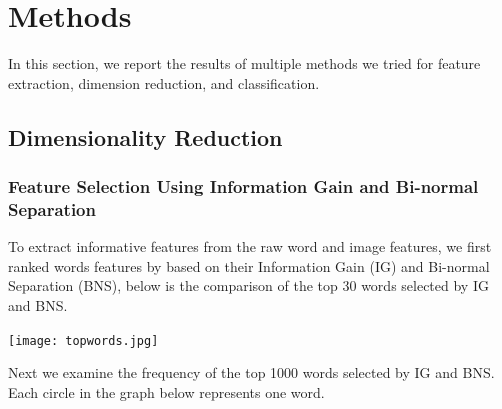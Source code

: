 \section{Methods}
In this section, we report the results of multiple methods we tried for feature extraction, dimension reduction, and classification. 


\subsection{Dimensionality Reduction}
\subsubsection{Feature Selection Using Information Gain and Bi-normal Separation}
To extract informative features from the raw word and image features,  we first ranked words features by based on their Information Gain (IG) and Bi-normal Separation (BNS), below is the comparison of the top 30 words selected by IG and BNS.   
\begin{center}
\texttt{[image: topwords.jpg]}
    \end{center}
Next we examine the frequency of the top 1000 words selected by IG and BNS. Each circle in the graph below represents one word.
\begin{center}
\end{center}
